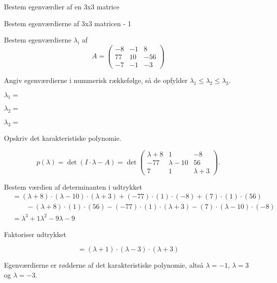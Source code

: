 \documentclass{article}
\begin{document}
Bestem egenværdier af en 3x3 matrice
\tableofcontents
\newpage

\begin{exercise}{Bestem egenværdierne af 3x3 matricen - 1}

Bestem egenværdierne $\lambda_i$ af 
\[
A=\begin{pmatrix}
-8 & -1 & 8 \\
77 & 10 & -56 \\
-7 & -1 & -3
\end{pmatrix}
\]

Angiv egenværdierne i nummerisk rækkefølge, så de
opfylder $\lambda_1 \le \lambda_2 \le \lambda_3$.

$\lambda_1 = $ 

$\lambda_2 = $ 

$\lambda_3 = $ 

\hint
Opskriv det karakteristiske polynomie.

\hint
\[
p(\lambda)=\det\left(I \cdot \lambda - A \right)=\det\begin{pmatrix}
\lambda + 8  & 1 & -8 \\
-77 & \lambda - 10 & 56 \\
7 & 1 & \lambda + 3
\end{pmatrix}.
\]

\hint
Bestem værdien af determinanten i udtrykket
\begin{align*}
&=(\lambda+8) \cdot (\lambda-10) \cdot (\lambda+3)+(-77) \cdot (1) \cdot (-8)+(7) \cdot (1) \cdot (56) \\
& \qquad -(\lambda+8) \cdot (1) \cdot (56)-(-77) \cdot (1) \cdot (\lambda+3)-(7) \cdot (\lambda-10) \cdot (-8) \\
&=\lambda^3+1\lambda^2-9\lambda-9
\end{align*}

\hint
Faktoriser udtrykket

\hint
\[
=(\lambda+1) \cdot (\lambda-3) \cdot (\lambda+3)
\]

\hint
Egenværdierne er rødderne af det karakteristiske polynomie, 
altså
$\lambda=-1$, $\lambda=3$ og $\lambda=-3$.

\end{exercise}
\end{document}
